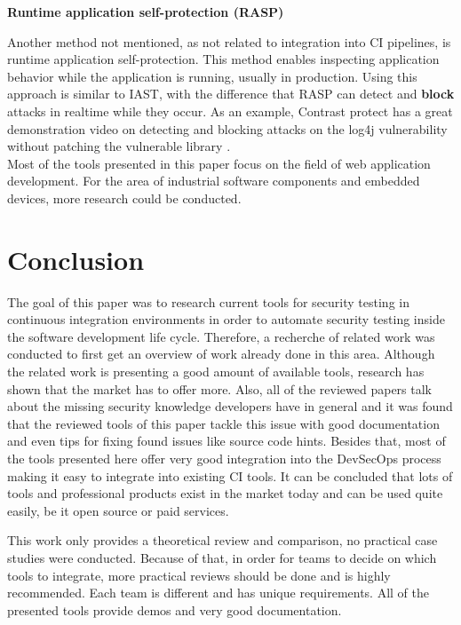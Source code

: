 \documentclass[conference]{IEEEtran}
\begin{document}
\textbf{Runtime application self-protection (RASP)}

Another method not mentioned, as not related to integration into CI pipelines, is runtime application self-protection. This method enables inspecting application behavior while the application is running, usually in production. Using this approach is similar to IAST, with the difference that RASP can detect and \textbf{block} attacks in realtime while they occur. As an example, Contrast protect has a great demonstration video on detecting and blocking attacks on the log4j vulnerability without patching the vulnerable library \cite{iast12}.\\

Most of the tools presented in this paper focus on the field of web application development. For the area of industrial software components and embedded devices, more research could be conducted.



\section{Conclusion}

The goal of this paper was to research current tools for security testing in continuous integration environments in order to automate security testing inside the software development life cycle. Therefore, a recherche of related work was conducted to first get an overview of work already done in this area. Although the related work is presenting a good amount of available tools, research has shown that the market has to offer more. Also, all of the reviewed papers talk about the missing security knowledge developers have in general and it was found that the reviewed tools of this paper tackle this issue with good documentation and even tips for fixing found issues like source code hints. Besides that, most of the tools presented here offer very good integration into the DevSecOps process making it easy to integrate into existing CI tools. It can be concluded that lots of tools and professional products exist in the market today and can be used quite easily, be it open source or paid services.

This work only provides a theoretical review and comparison, no practical case studies were conducted. Because of that, in order for teams to decide on which tools to integrate, more practical reviews should be done and is highly recommended. Each team is different and has unique requirements. All of the presented tools provide demos and very good documentation.
\end{document}
